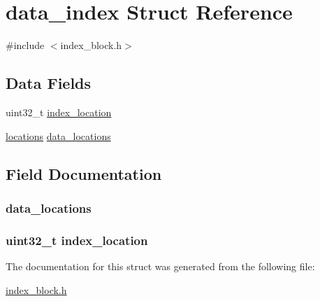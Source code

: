 \hypertarget{structdata__index}{\section{data\-\_\-index Struct Reference}
\label{structdata__index}
}


{\ttfamily \#include $<$index\-\_\-block.\-h$>$}

\subsection*{Data Fields}
\begin{DoxyCompactItemize}
\item 
uint32\-\_\-t \hyperlink{structdata__index_a9f7ac2c27413909a97f1ba11bfd7ff98}{index\-\_\-location}
\item 
\hyperlink{glob__data_8h_a9d4937e46b9fac69334d5fc7ea3f37a6}{locations} \hyperlink{structdata__index_ae3cb32a3d2f9b47cbd3909eb7aec6a9b}{data\-\_\-locations}
\end{DoxyCompactItemize}


\subsection{Field Documentation}
\hypertarget{structdata__index_ae3cb32a3d2f9b47cbd3909eb7aec6a9b}{
\subsubsection[{data\-\_\-locations}]{ data\-\_\-locations}}\label{structdata__index_ae3cb32a3d2f9b47cbd3909eb7aec6a9b}
\hypertarget{structdata__index_a9f7ac2c27413909a97f1ba11bfd7ff98}{
\subsubsection[{index\-\_\-location}]{\setlength{\rightskip}{0pt plus 5cm}uint32\-\_\-t index\-\_\-location}}\label{structdata__index_a9f7ac2c27413909a97f1ba11bfd7ff98}


The documentation for this struct was generated from the following file\-:\begin{DoxyCompactItemize}
\item 
\hyperlink{index__block_8h}{index\-\_\-block.\-h}\end{DoxyCompactItemize}
